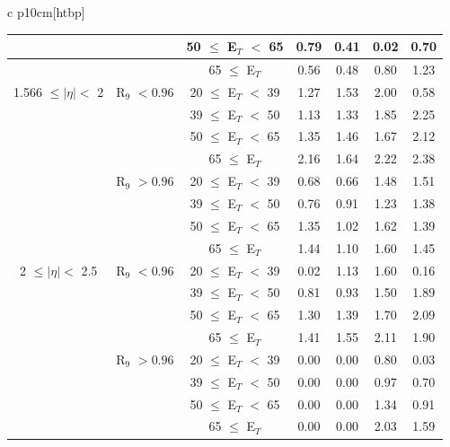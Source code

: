 \begin{table}{ c p{10cm}}[htbp]
\begin{tabular}{|c  c  c | c | c | c | c |}
        &  & 50 $\leq$ E$_T$ $<$ 65                                          & 0.79 & 0.41 & 0.02 & 0.70 \\ \hline
        &  & 65 $\leq$ E$_T$                                                 & 0.56 & 0.48 & 0.80 & 1.23 \\ \hline
        1.566 $\leq |\eta| <$ 2 & R$_{9}$ $< 0.96$ & 20 $\leq$ E$_T$ $<$ 39  & 1.27 & 1.53 & 2.00 & 0.58 \\ \hline
        &  & 39 $\leq$ E$_T$ $<$ 50                                          & 1.13 & 1.33 & 1.85 & 2.25 \\ \hline
        &  & 50 $\leq$ E$_T$ $<$ 65                                          & 1.35 & 1.46 & 1.67 & 2.12 \\ \hline
        &  & 65 $\leq$ E$_T$                                                 & 2.16 & 1.64 & 2.22 & 2.38 \\ \hline
        & R$_{9}$ $> 0.96$ & 20 $\leq$ E$_T$ $<$ 39                          & 0.68 & 0.66 & 1.48 & 1.51 \\ \hline
        &  & 39 $\leq$ E$_T$ $<$ 50                                          & 0.76 & 0.91 & 1.23 & 1.38 \\ \hline
        &  & 50 $\leq$ E$_T$ $<$ 65                                          & 1.35 & 1.02 & 1.62 & 1.39 \\ \hline
        &  & 65 $\leq$ E$_T$                                                 & 1.44 & 1.10 & 1.60 & 1.45 \\ \hline
        2 $\leq |\eta| <$ 2.5 & R$_{9}$ $< 0.96$ & 20 $\leq$ E$_T$ $<$ 39    & 0.02 & 1.13 & 1.60 & 0.16 \\ \hline
        &  & 39 $\leq$ E$_T$ $<$ 50                                          & 0.81 & 0.93 & 1.50 & 1.89 \\ \hline
        &  & 50 $\leq$ E$_T$ $<$ 65                                          & 1.30 & 1.39 & 1.70 & 2.09 \\ \hline
        &  & 65 $\leq$ E$_T$                                                 & 1.41 & 1.55 & 2.11 & 1.90 \\ \hline
        & R$_{9}$ $> 0.96$ & 20 $\leq$ E$_T$ $<$ 39                          & 0.00 & 0.00 & 0.80 & 0.03 \\ \hline
        &  & 39 $\leq$ E$_T$ $<$ 50                                          & 0.00 & 0.00 & 0.97 & 0.70 \\ \hline
        &  & 50 $\leq$ E$_T$ $<$ 65                                          & 0.00 & 0.00 & 1.34 & 0.91 \\ \hline
        &  & 65 $\leq$ E$_T$                                                 & 0.00 & 0.00 & 2.03 & 1.59 \\ \hline
    \end{tabular}
    \label{tab:stochasticSmearings_Run2}
\end{table}


